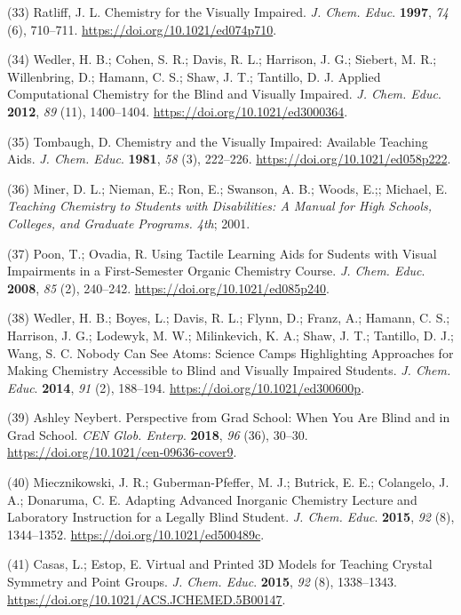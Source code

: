 \documentclass[11.5pt]{sig-alternate} %
\begin{document}
(33)	Ratliff, J. L. Chemistry for the Visually Impaired. \textit{J. Chem. Educ}. \textbf{1997}, \textit{74} (6), 710–711. \url{https://doi.org/10.1021/ed074p710}.

(34)	Wedler, H. B.; Cohen, S. R.; Davis, R. L.; Harrison, J. G.; Siebert, M. R.; Willenbring, D.; Hamann, C. S.; Shaw, J. T.; Tantillo, D. J. Applied Computational Chemistry for the Blind and Visually Impaired. \textit{J. Chem. Educ}. \textbf{2012}, \textit{89} (11), 1400–1404. \url{https://doi.org/10.1021/ed3000364}.

(35)	Tombaugh, D. Chemistry and the Visually Impaired: Available Teaching Aids. \textit{J. Chem. Educ}. \textbf{1981}, \textit{58} (3), 222–226. \url{https://doi.org/10.1021/ed058p222}.

(36)	Miner, D. L.; Nieman, E.; Ron, E.; Swanson, A. B.; Woods, E.;; Michael, E. \textit{Teaching Chemistry to Students with Disabilities: A Manual for High Schools, Colleges, and Graduate Programs. 4th}; 2001.

(37)	Poon, T.; Ovadia, R. Using Tactile Learning Aids for Sudents with Visual Impairments in a First-Semester Organic Chemistry Course. \textit{J. Chem. Educ}. \textbf{2008}, \textit{85} (2), 240–242. \url{https://doi.org/10.1021/ed085p240}.

(38)	Wedler, H. B.; Boyes, L.; Davis, R. L.; Flynn, D.; Franz, A.; Hamann, C. S.; Harrison, J. G.; Lodewyk, M. W.; Milinkevich, K. A.; Shaw, J. T.; Tantillo, D. J.; Wang, S. C. Nobody Can See Atoms: Science Camps Highlighting Approaches for Making Chemistry Accessible to Blind and Visually Impaired Students.\textit{ J. Chem. Educ}. \textbf{2014}, \textit{91} (2), 188–194. \url{https://doi.org/10.1021/ed300600p}.

(39)	Ashley Neybert. Perspective from Grad School: When You Are Blind and in Grad School. \textit{CEN Glob. Enterp}. \textbf{2018}, \textit{96} (36), 30–30. \url{https://doi.org/10.1021/cen-09636-cover9}.

(40)	Miecznikowski, J. R.; Guberman-Pfeffer, M. J.; Butrick, E. E.; Colangelo, J. A.; Donaruma, C. E. Adapting Advanced Inorganic Chemistry Lecture and Laboratory Instruction for a Legally Blind Student. \textit{J. Chem. Educ}. \textbf{2015}, \textit{92} (8), 1344–1352. \url{https://doi.org/10.1021/ed500489c}.

(41)	Casas, L.; Estop, E. Virtual and Printed 3D Models for Teaching Crystal Symmetry and Point Groups. \textit{J. Chem. Educ}. \textbf{2015}, \textit{92} (8), 1338–1343. \url{https://doi.org/10.1021/ACS.JCHEMED.5B00147}.
\end{document}
